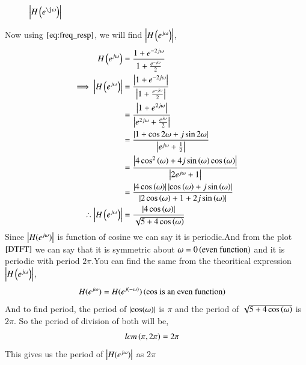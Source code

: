 \documentclass[journal,12pt,twocolumn]{IEEEtran}
\renewcommand\thesection{\arabic{section}}
\begin{document}
\begin{enumerate}[label=\thesection.\arabic*]
\begin{figure}[!ht]
                \caption{$\abs{H\brak{e^{\j\omega}}}$}
                \label{fig:dtft}
           \end{figure}
           Now using $\eqref{eq:freq_resp}$, we will find $\left\vert H\left(e^{j \omega}\right)\right\vert$,
           \begin{align}
                H\left(e^{j \omega}\right)                  & = \frac{1+e^{-2j\omega}}{1 + \frac{e^{-j\omega}}{2}}                                                                              \\
                \implies \left\vert H\left(e^{j \omega}\right)\right\vert   & = \frac{\left\vert1+e^{-2j\omega}\right\vert}{\left\vert1 + \frac{e^{-j\omega}}{2}\right\vert}                                                                  \\
                                                      & = \frac{\left\vert1+e^{2j\omega}\right\vert}{\left\vert e^{2j\omega} + \frac{e^{j\omega}}{2}\right\vert}                                                         \\
                                                      & = \frac{\left\vert1+\cos2\omega + j\sin2\omega\right\vert}{\left\vert e^{j\omega}+ \frac{1}{2}\right\vert}                                                       \\
                                                      & = \frac{\left\vert4\cos^2\left(\omega\right) + 4j\sin\left(\omega\right)\cos\left(\omega\right)\right\vert}{\left\vert2e^{j\omega} + 1\right\vert}                                \\
                                                      & = \frac{\left\vert4\cos\left(\omega\right)\right\vert\left\vert\cos\left(\omega\right) + j\sin\left(\omega\right)\right\vert}{\left\vert2\cos\left(\omega\right) + 1 + 2j\sin\left(\omega\right)\right\vert} \\
                \therefore \left\vert H\left(e^{j \omega}\right)\right\vert & = \frac{\left\vert4\cos\left(\omega\right)\right\vert}{\sqrt{5 +4\cos\left(\omega\right)}}
           \end{align}
           Since $\left\vert H(e^{j\omega})\right\vert$ is function of cosine we can say it is periodic.And from the plot $\ref{DTFT}$ we can say that it is symmetric about $\omega = 0\left(\text{even function}\right)$ and it is periodic with period $2\pi$.You can find the same from the theoritical expression $\left\vert H\left(e^{j \omega}\right)\right\vert$,
           \begin{align}
                H(e^{j\omega}) & = H(e^{j(-\omega)})\left(\text{cos is an even function}\right)
           \end{align}
           And to find period, the period of $\left\vert\cos(\omega)\right\vert$ is $\pi$ and the period of $\sqrt{5 + 4\cos\left(\omega\right)}$ is $2\pi$. So the period of division of both will be,
           \begin{align}
                lcm\left(\pi,2\pi\right) & = 2\pi
           \end{align}
           This gives us the period of $\left\vert H(e^{j\omega})\right\vert$ as $2\pi$


\end{enumerate}
\end{document}
